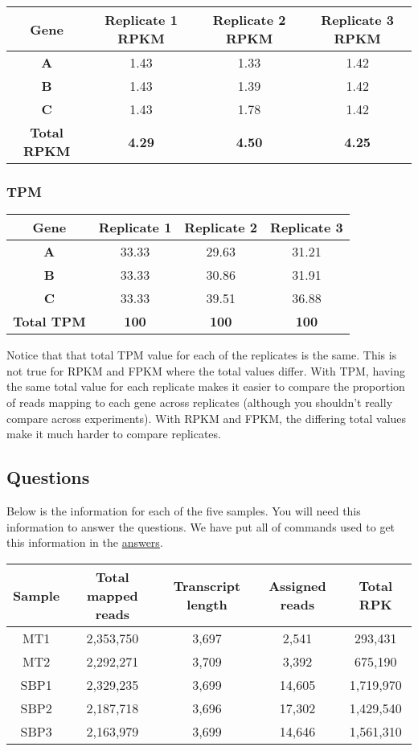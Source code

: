 \documentclass[11pt]{article}
\begin{document}
\begin{longtable}[]{@{}cccc@{}}
\hline
Gene & Replicate 1 RPKM & Replicate 2 RPKM & Replicate 3
RPKM\tabularnewline
\hline
\endhead
\textbf{A} & 1.43 & 1.33 & 1.42\tabularnewline
\textbf{B} & 1.43 & 1.39 & 1.42\tabularnewline
\textbf{C} & 1.43 & 1.78 & 1.42\tabularnewline
\textbf{Total RPKM} & \textbf{4.29} & \textbf{4.50} &
\textbf{4.25}\tabularnewline
\hline
\end{longtable}

\hypertarget{tpm}{%
\subsubsection{TPM}\label{tpm}}

\begin{longtable}[]{@{}cccc@{}}
\hline
Gene & Replicate 1 & Replicate 2 & Replicate 3\tabularnewline
\hline
\endhead
\textbf{A} & 33.33 & 29.63 & 31.21\tabularnewline
\textbf{B} & 33.33 & 30.86 & 31.91\tabularnewline
\textbf{C} & 33.33 & 39.51 & 36.88\tabularnewline
\textbf{Total TPM} & \textbf{100} & \textbf{100} &
\textbf{100}\tabularnewline
\hline
\end{longtable}

Notice that that total TPM value for each of the replicates is the same.
This is not true for RPKM and FPKM where the total values differ. With
TPM, having the same total value for each replicate makes it easier to
compare the proportion of reads mapping to each gene across replicates
(although you shouldn't really compare across experiments). With RPKM
and FPKM, the differing total values make it much harder to compare
replicates.

\newpage

    \hypertarget{questions}{%
\subsection{Questions}\label{questions}}

Below is the information for each of the five samples. You will need
this information to answer the questions. We have put all of commands
used to get this information in the \href{aanswers.ipynb}{answers}.

\begin{longtable}[]{@{}ccccc@{}}
\hline
Sample & Total mapped reads & Transcript length & Assigned reads & Total
RPK\tabularnewline
\hline
\endhead
MT1 & 2,353,750 & 3,697 & 2,541 & 293,431\tabularnewline
MT2 & 2,292,271 & 3,709 & 3,392 & 675,190\tabularnewline
SBP1 & 2,329,235 & 3,699 & 14,605 & 1,719,970\tabularnewline
SBP2 & 2,187,718 & 3,696 & 17,302 & 1,429,540\tabularnewline
SBP3 & 2,163,979 & 3,699 & 14,646 & 1,561,310\tabularnewline
\hline
\end{longtable}
\end{document}
